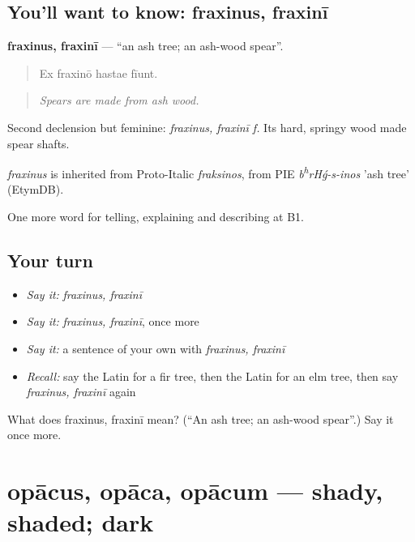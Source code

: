 \subsection*{You'll want to know: fraxinus, fraxinī}
\textbf{fraxinus, fraxinī} — \textquotedblleft{}an ash tree; an ash-wood spear\textquotedblright{}.

\begin{quote}
Ex fraxinō hastae fīunt.
\end{quote}

\begin{quote}
\emph{Spears are made from ash wood.}
\end{quote}

Second declension but feminine: \emph{fraxinus, fraxinī f.} Its hard, springy wood made spear shafts.

\begin{cousinweb}
\emph{fraxinus} is inherited from Proto-Italic \emph{fraksinos}, from PIE \emph{b\textsuperscript{h}rHǵ-s-inos} 'ash tree' (EtymDB).
\end{cousinweb}

\begin{grammarlens}[title={What you've built}]
One more word for telling, explaining and describing at B1.
\end{grammarlens}

\subsection*{Your turn}
\begin{itemize}
\raggedright
  \item \emph{Say it:} \emph{fraxinus, fraxinī}
  \item \emph{Say it:} \emph{fraxinus, fraxinī}, once more
  \item \emph{Say it:} a sentence of your own with \emph{fraxinus, fraxinī}
  \item \emph{Recall:} say the Latin for a fir tree, then the Latin for an elm tree, then say \emph{fraxinus, fraxinī} again
\end{itemize}

\begin{tcolorbox}[breakable,colback=teal!4,colframe=teal!35!black,title={Before you move on}]
What does fraxinus, fraxinī mean? (\textquotedblleft{}An ash tree; an ash-wood spear\textquotedblright{}.) Say it once more.
\end{tcolorbox}
\section[opācus, opāca, opācum]{opācus, opāca, opācum — shady, shaded; dark}

